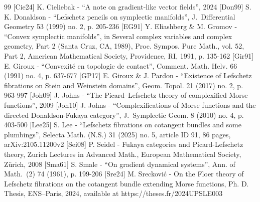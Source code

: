 \begin{thebibliography}{99}
 [Cie24] K. Cieliebak - “A note on gradient-like vector fields”, 2024
 [Don99] S. K. Donaldson - “Lefschetz pencils on symplectic manifolds”, J. Differential Geometry 53 (1999) no. 2, p. 205-236
 [EG91] Y. Eliashberg \& M. Gromov - “Convex symplectic manifolds”, in Several complex variables and complex geometry, Part 2 (Santa Cruz, CA, 1989), Proc. Sympos. Pure Math., vol. 52, Part 2, American Mathematical Society, Providence, RI, 1991, p. 135-162
 [Gir91] E. Giroux - “Convexité en topologie de contact”, Comment. Math. Helv. 66 (1991) no. 4, p. 637-677
 [GP17] E. Giroux \& J. Pardon - “Existence of Lefschetz fibrations on Stein and Weinstein domains”, Geom. Topol. 21 (2017) no. 2, p. 963-997
 [Joh09] J. Johns - “The Picard–Lefschetz theory of complexified Morse functions”, 2009
 [Joh10] J. Johns - “Complexifications of Morse functions and the directed Donaldson-Fukaya category”, J. Symplectic Geom. 8 (2010) no. 4, p. 403-500
 [Lee25] S. Lee - “Lefschetz fibrations on cotangent bundles and some plumbings”, Selecta Math. (N.S.) 31 (2025) no. 5, article ID 91, 86 pages, arXiv:2105.11200v2
 [Sei08] P. Seidel - Fukaya categories and Picard-Lefschetz theory, Zurich Lectures in Advanced Math., European Mathematical Society, Zürich, 2008
 [Sma61] S. Smale - “On gradient dynamical systems”, Ann. of Math. (2) 74 (1961), p. 199-206
 [Sre24] M. Srecković - On the Floer theory of Lefschetz fibrations on the cotangent bundle extending Morse functions, Ph. D. Thesis, ENS–Paris, 2024, available at https://theses.fr/2024UPSLE003
\end{thebibliography}
